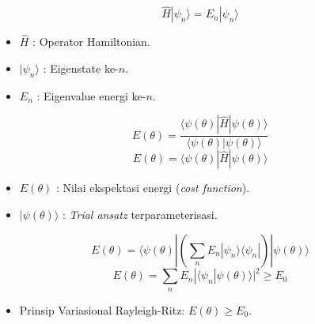 \begin{equation}
    \hat{H} |\psi_n\rangle = E_n |\psi_n\rangle
\end{equation}
\begin{itemize}
    \item $\hat{H}$ : Operator Hamiltonian.
    \item $|\psi_n\rangle$ : Eigenstate ke-$n$.
    \item $E_n$ : Eigenvalue energi ke-$n$.
\end{itemize}

\begin{equation}
    E(\theta) = \frac{\langle \psi(\theta) | \hat{H} | \psi(\theta) \rangle}{\langle \psi(\theta) | \psi(\theta) \rangle}
\end{equation}
\begin{equation}
    E(\theta) = \langle \psi(\theta) | \hat{H} | \psi(\theta) \rangle
\end{equation}
\begin{itemize}
    \item $E(\theta)$ : Nilai ekspektasi energi (\textit{cost function}).
    \item $|\psi(\theta)\rangle$ : \textit{Trial ansatz} terparameterisasi.
\end{itemize}

\begin{equation}
    E(\theta) = \langle \psi(\theta) | \left( \sum_n E_n | \psi_n \rangle \langle \psi_n | \right) | \psi(\theta) \rangle
\end{equation}
\begin{equation}
    E(\theta) = \sum_n E_n |\langle \psi_n | \psi(\theta) \rangle|^2 \geq E_0
\end{equation}
\begin{itemize}
    \item Prinsip Variasional Rayleigh-Ritz: $E(\theta) \geq E_0$.
\end{itemize}

